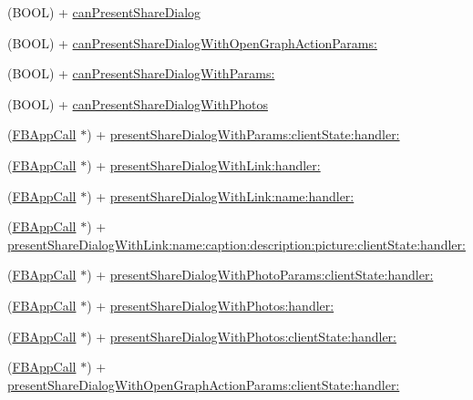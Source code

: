 \begin{DoxyCompactItemize}
\item 
(B\+O\+OL) + \hyperlink{interfaceFBDialogs_a017ecb9200d66140929cce227723a4d5}{can\+Present\+Share\+Dialog}
\item 
(B\+O\+OL) + \hyperlink{interfaceFBDialogs_ad8921a3906d28210cad0c0871e99f4bd}{can\+Present\+Share\+Dialog\+With\+Open\+Graph\+Action\+Params\+:}
\item 
(B\+O\+OL) + \hyperlink{interfaceFBDialogs_a36e9e390bb8c6040e6027b647ed587e8}{can\+Present\+Share\+Dialog\+With\+Params\+:}
\item 
(B\+O\+OL) + \hyperlink{interfaceFBDialogs_a16156d6a4664e4ea55e351bc78b6e8a7}{can\+Present\+Share\+Dialog\+With\+Photos}
\item 
(\hyperlink{interfaceFBAppCall}{F\+B\+App\+Call} $\ast$) + \hyperlink{interfaceFBDialogs_aea8f6d762fa50f312e7d574d27439349}{present\+Share\+Dialog\+With\+Params\+:client\+State\+:handler\+:}
\item 
(\hyperlink{interfaceFBAppCall}{F\+B\+App\+Call} $\ast$) + \hyperlink{interfaceFBDialogs_ad3172e31c558d23fd2546e482e6ad76a}{present\+Share\+Dialog\+With\+Link\+:handler\+:}
\item 
(\hyperlink{interfaceFBAppCall}{F\+B\+App\+Call} $\ast$) + \hyperlink{interfaceFBDialogs_a5f935e0fdc377b269f9cf021e242f72e}{present\+Share\+Dialog\+With\+Link\+:name\+:handler\+:}
\item 
(\hyperlink{interfaceFBAppCall}{F\+B\+App\+Call} $\ast$) + \hyperlink{interfaceFBDialogs_aaed28cb89925f451c2d8bab8f1b44e22}{present\+Share\+Dialog\+With\+Link\+:name\+:caption\+:description\+:picture\+:client\+State\+:handler\+:}
\item 
(\hyperlink{interfaceFBAppCall}{F\+B\+App\+Call} $\ast$) + \hyperlink{interfaceFBDialogs_ad8f870b0c951157f3f3c9de5f42031ae}{present\+Share\+Dialog\+With\+Photo\+Params\+:client\+State\+:handler\+:}
\item 
(\hyperlink{interfaceFBAppCall}{F\+B\+App\+Call} $\ast$) + \hyperlink{interfaceFBDialogs_aeaf0798a6057ed03c6a3cc26aa624a27}{present\+Share\+Dialog\+With\+Photos\+:handler\+:}
\item 
(\hyperlink{interfaceFBAppCall}{F\+B\+App\+Call} $\ast$) + \hyperlink{interfaceFBDialogs_abc4827f34c1e7e82b34216e6b9330cd8}{present\+Share\+Dialog\+With\+Photos\+:client\+State\+:handler\+:}
\item 
(\hyperlink{interfaceFBAppCall}{F\+B\+App\+Call} $\ast$) + \hyperlink{interfaceFBDialogs_a2fd765d39b1e4e4a9d4252762694b2b9}{present\+Share\+Dialog\+With\+Open\+Graph\+Action\+Params\+:client\+State\+:handler\+:}

\end{DoxyCompactItemize}
